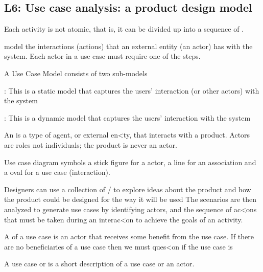 \subsection{L6: Use case analysis: a product design model}
\begin{compactitem}
\item Each activity is not atomic, that is, it can be divided up into a sequence of .
\item {}
model the interactions (actions) that an
external entity (an actor) has with the system. Each actor in a use case must require one of the steps.

\item A Use Case Model consists of two sub-models
\begin{compactitem}
\item {}:
This is a
static model
that
captures the users’ interaction (or other actors) with the system
\item {}:
This is a
dynamic model
that captures the users’ interaction with the
system 
\item 
\end{compactitem}
\item An
is a type of agent, or external en<ty, that interacts
with a product. Actors are roles not individuals; the product is
never
an
actor.

\item {Use case diagram symbols} a stick figure for a actor, a line for an association and a oval for a use case (interaction).

\item Designers can use a collection of /  to explore ideas
about the product and how the product could be designed
for the way it will be used
The scenarios are then analyzed to generate use cases by
identifying actors, and the sequence of ac<ons that must be
taken during an interac<on to achieve the goals of an
activity. 

\item A
of a use case is an actor that receives some benefit
from the use case. If there are
no
beneficiaries of a use case then
we must ques<on if the use case is 

\item A
use case
or
is a short description of a use
case or an actor. 


\end{compactitem}
